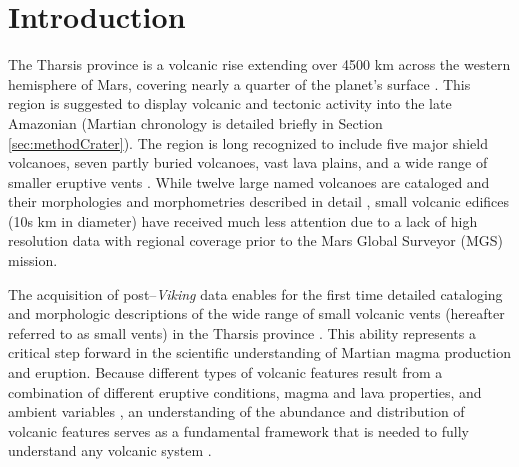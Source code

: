 \section{Introduction}
\label{sec-intro}

The Tharsis province is a volcanic rise extending over 4500 km across the western hemisphere of Mars, covering nearly a quarter of the planet's surface \citep{Hodges1994}. This region is suggested to display volcanic and tectonic activity into the late Amazonian \citep{Anderson2001,Neukum2004} (Martian chronology is detailed briefly in Section \ref{sec:methodCrater}). The region is long recognized to include five major shield volcanoes, seven partly buried volcanoes, vast lava plains, and a wide range of smaller eruptive vents \citep{Carr1977,Greeley1981,MouginisMark1992,Hodges1994}. While twelve large named volcanoes are cataloged and their morphologies and morphometries described in detail \citep[][and references therein]{Hodges1994,Plescia2004}, small volcanic edifices (10s km in diameter) have received much less attention due to a lack of high resolution data with regional coverage prior to the Mars Global Surveyor (MGS) mission.

The acquisition of post--\textit{Viking} data enables for the first time detailed cataloging and morphologic descriptions of the wide range of small volcanic vents (hereafter referred to as small vents) in the Tharsis province \citep{Baptista2008,Baratoux2009,Bleacher2007,Bleacher2009,Broz2012,Hauber2009,Hauber2011,Keszthelyi2008,Wilson2009}. This ability represents a critical step forward in the scientific understanding of Martian magma production and eruption. Because different types of volcanic features result from a combination of different eruptive conditions, magma and lava properties, and ambient variables \citep{Greeley1977,WhitfordStark1982}, an understanding of the abundance and distribution of volcanic features serves as a fundamental framework that is needed to fully understand any volcanic system \citep{Head1981,Connor2000}.

